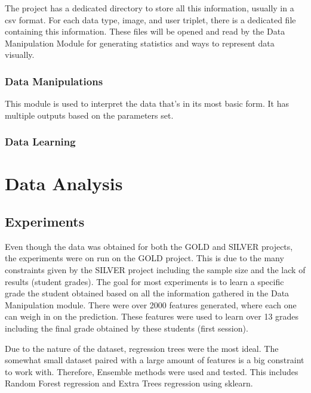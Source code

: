 \documentclass[a4paper,11pt]{report}
\numberwithin{figure}{section} %
\begin{document}
        
        The project has a dedicated directory to store all this information, usually in a csv format. For each data type, image, and user triplet, there is a dedicated file containing this information. These files will be opened and read by the Data Manipulation Module for generating statistics and ways to represent data visually.
        
        
	\subsubsection{Data Manipulations}
    
    This module is used to interpret the data that's in its most basic form. It has multiple outputs based on the parameters set.

	\subsubsection{Data Learning}
    
	\subsection{}


\section{Data Analysis}

	\subsection{Experiments}
    
    
    Even though the data was obtained for both the GOLD and SILVER projects, the experiments were on run on the GOLD project. This is due to the many constraints given by the SILVER project including the sample size and the lack of results (student grades). The goal for most experiments is to learn a specific grade the student obtained based on all the information gathered in the Data Manipulation module. There were over 2000 features generated, where each one can weigh in on the prediction. These features were used to learn over 13 grades including the final grade obtained by these students (first session).\newline
    
    
    Due to the nature of the dataset, regression trees were the most ideal. The somewhat small dataset paired with a large amount of features is a big constraint to work with. Therefore, Ensemble methods were used and tested. This includes Random Forest regression and Extra Trees regression using sklearn.\newline
    
\end{document}
